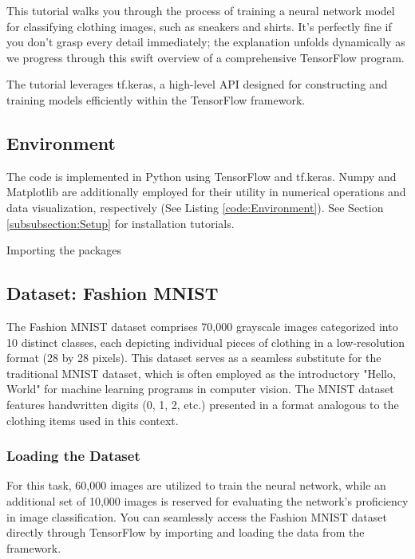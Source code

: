 This tutorial walks you through the process of training a neural network model for classifying clothing images, such as sneakers and shirts. It's perfectly fine if you don't grasp every detail immediately; the explanation unfolds dynamically as we progress through this swift overview of a comprehensive TensorFlow program.

The tutorial leverages tf.keras, a high-level API designed for constructing and training models efficiently within the TensorFlow framework.


\subsection{Environment}

The code is implemented in Python using TensorFlow and tf.keras. Numpy and Matplotlib are additionally employed for their utility in numerical operations and data visualization, respectively (See Listing \ref{code:Environment}). See Section \ref{subsubsection:Setup} for installation tutorials.

\begin{code}[h!]
	    
	
	\caption{Importing the packages}
	\label{code:Environment}
\end{code}

\subsection{Dataset: Fashion MNIST}

The Fashion MNIST dataset comprises 70,000 grayscale images categorized into 10 distinct classes, each depicting individual pieces of clothing in a low-resolution format (28 by 28 pixels). This dataset serves as a seamless substitute for the traditional MNIST dataset, which is often employed as the introductory "Hello, World" for machine learning programs in computer vision. The MNIST dataset features handwritten digits (0, 1, 2, etc.) presented in a format analogous to the clothing items used in this context.


\subsubsection{Loading the Dataset}

For this task, 60,000 images are utilized to train the neural network, while an additional set of 10,000 images is reserved for evaluating the network's proficiency in image classification. You can seamlessly access the Fashion MNIST dataset directly through TensorFlow by importing and loading the data from the framework.

